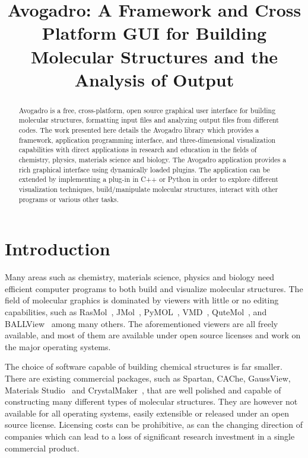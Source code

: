 \documentclass{article}
\title{Avogadro: A Framework and Cross Platform GUI for Building Molecular Structures and the Analysis of Output}
\begin{document}
\maketitle

\begin{abstract}

Avogadro is a free, cross-platform, open source graphical user interface for building molecular structures, formatting input files and analyzing output files from different codes. The work presented here details the Avogadro library which provides a framework, application programming interface, and three-dimensional visualization capabilities with direct applications in research and education in the fields of chemistry, physics, materials science and biology. The Avogadro application provides a rich graphical interface using dynamically loaded plugins. The application can be extended by implementing a plug-in in C++ or Python in order to explore different visualization techniques, build/manipulate molecular structures, interact with other programs or various other tasks.

\end{abstract}

\section{Introduction}

Many areas such as chemistry, materials science, physics and biology need efficient computer programs to both build and visualize molecular structures. The field of molecular graphics is dominated by viewers with little or no editing capabilities, such as RasMol~\cite{RasMol}, JMol~\cite{JMol}, PyMOL~\cite{PyMOL}, VMD~\cite{VMD}, QuteMol~\cite{QuteMol}, and BALLView~\cite{BALLView} among many others. The aforementioned viewers are all freely available, and most of them are available under open source licenses and work on the major operating systems.

The choice of software capable of building chemical structures is far smaller. There are existing commercial packages, such as Spartan, CAChe, GaussView, Materials Studio~\cite{Accelrys} and CrystalMaker~\cite{CrystalMaker}, that are well polished and capable of constructing many different types of molecular structures. They are however not available for all operating systems, easily extensible or released under an open source license. Licensing costs can be prohibitive, as can the changing direction of companies which can lead to a loss of significant research investment in a single commercial product.
\end{document}
